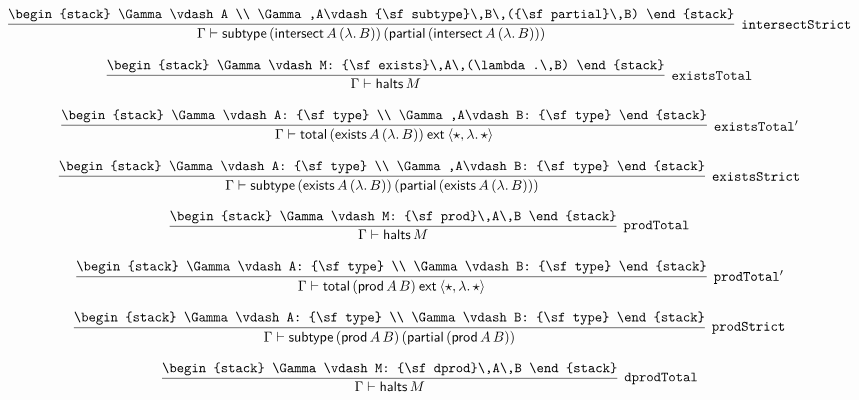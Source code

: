 \[
\infer[{\tt intersectStrict}]{\Gamma \vdash {\sf subtype}\,({\sf intersect}\,A\,(\lambda .\,B))\,({\sf partial}\,({\sf intersect}\,A\,(\lambda .\,B)))}{
\begin{stack}
\Gamma \vdash A
\\
\Gamma ,A\vdash {\sf subtype}\,B\,({\sf partial}\,B)
\end{stack}}
\]

\[
\infer[{\tt existsTotal}]{\Gamma \vdash {\sf halts}\,M}{
\begin{stack}
\Gamma \vdash M: {\sf exists}\,A\,(\lambda .\,B)
\end{stack}}
\]

\[
\infer[{\tt existsTotal'}]{\Gamma \vdash {\sf total}\,({\sf exists}\,A\,(\lambda .\,B))\:{\sf ext}\:\langle \star ,\lambda .\,\star \rangle }{
\begin{stack}
\Gamma \vdash A: {\sf type}
\\
\Gamma ,A\vdash B: {\sf type}
\end{stack}}
\]

\[
\infer[{\tt existsStrict}]{\Gamma \vdash {\sf subtype}\,({\sf exists}\,A\,(\lambda .\,B))\,({\sf partial}\,({\sf exists}\,A\,(\lambda .\,B)))}{
\begin{stack}
\Gamma \vdash A: {\sf type}
\\
\Gamma ,A\vdash B: {\sf type}
\end{stack}}
\]

\[
\infer[{\tt prodTotal}]{\Gamma \vdash {\sf halts}\,M}{
\begin{stack}
\Gamma \vdash M: {\sf prod}\,A\,B
\end{stack}}
\]

\[
\infer[{\tt prodTotal'}]{\Gamma \vdash {\sf total}\,({\sf prod}\,A\,B)\:{\sf ext}\:\langle \star ,\lambda .\,\star \rangle }{
\begin{stack}
\Gamma \vdash A: {\sf type}
\\
\Gamma \vdash B: {\sf type}
\end{stack}}
\]

\[
\infer[{\tt prodStrict}]{\Gamma \vdash {\sf subtype}\,({\sf prod}\,A\,B)\,({\sf partial}\,({\sf prod}\,A\,B))}{
\begin{stack}
\Gamma \vdash A: {\sf type}
\\
\Gamma \vdash B: {\sf type}
\end{stack}}
\]

\[
\infer[{\tt dprodTotal}]{\Gamma \vdash {\sf halts}\,M}{
\begin{stack}
\Gamma \vdash M: {\sf dprod}\,A\,B
\end{stack}}
\]

